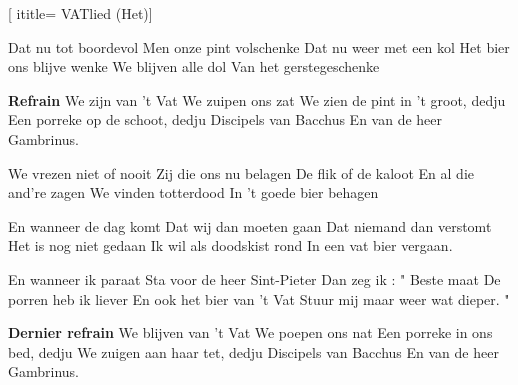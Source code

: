  [
ititle= {VATlied (Het)}]


\beginverse
Dat nu tot boordevol
Men onze pint volschenke
Dat nu weer met een kol
Het bier ons blijve wenke
We blijven alle dol
Van het gerstegeschenke
\endverse

\beginchorus
\textbf {Refrain}
We zijn van 't Vat
We zuipen ons zat
We zien de pint in 't groot, dedju
Een porreke op de schoot, dedju
Discipels van Bacchus
En van de heer Gambrinus.
\endchorus

\beginverse
We vrezen niet of nooit
Zij die ons nu belagen
De flik of de kaloot
En al die and're zagen
We vinden totterdood
In 't goede bier behagen
\endverse

\beginverse
En wanneer de dag komt
Dat wij dan moeten gaan
Dat niemand dan verstomt
Het is nog niet gedaan
Ik wil als doodskist rond
In een vat bier vergaan.
\endverse

\beginverse
En wanneer ik paraat
Sta voor de heer Sint-Pieter
Dan zeg ik : " Beste maat
De porren heb ik liever
En ook het bier van 't Vat
Stuur mij maar weer wat dieper. "
\endverse

\beginverse
\textbf {Dernier refrain}
We blijven van 't Vat
We poepen ons nat
Een porreke in ons bed, dedju
We zuigen aan haar tet, dedju
Discipels van Bacchus
En van de heer Gambrinus.
\endverse

\endsong